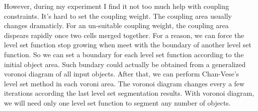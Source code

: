 However, during my experiment I find it not too much help with coupling constraints. It's hard to set the coupling weight. The coupling area usually changes dramaticly. For an un-suitable coupling weight, the coupling area dispears rapidly once two cells merged together. For a reason, we can force the level set function stop growing when meet with the boundary of another level set function. So we can set a boundary for each level set function according to the initial object area. Such bundary could actually be obtained from a generalized voronoi diagram of all input objects. After that, we can perform Chan-Vese's level set method in each voroni area. The voronoi diagram changes every a few iterations according the last level set segmentation results. With voronoi diagram, we will need only one level set function to segment any number of objects. 

